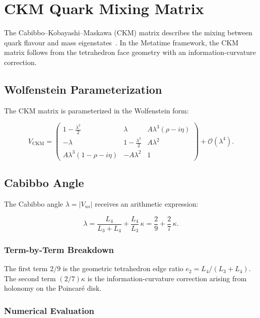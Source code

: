 \chapter{CKM Quark Mixing Matrix}
\label{ch:ckm_matrix}

The Cabibbo--Kobayashi--Maskawa (CKM) matrix describes the mixing between
quark flavour and mass eigenstates~\cite{kobayashi1973}.  In the Metatime
framework, the CKM matrix follows from the tetrahedron face geometry with
an information-curvature correction.

\section{Wolfenstein Parameterization}

The CKM matrix is parameterized in the Wolfenstein form:

\[
V_{\text{CKM}} =
\begin{pmatrix}
1 - \frac{\lambda^2}{2} & \lambda & A\lambda^3(\rho - i\eta) \\
-\lambda & 1 - \frac{\lambda^2}{2} & A\lambda^2 \\
A\lambda^3(1 - \rho - i\eta) & -A\lambda^2 & 1
\end{pmatrix}
+ \mathcal{O}(\lambda^4).
\]

\section{Cabibbo Angle}

The Cabibbo angle \(\lambda = |V_{us}|\) receives an arithmetic expression:

\begin{equation}
\lambda = \frac{L_4}{L_3 + L_4} + \frac{L_4}{L_3}\,\kappa
       = \frac{2}{9} + \frac{2}{7}\,\kappa.
\label{eq:lambda}
\end{equation}

\subsection{Term-by-Term Breakdown}

The first term \(2/9\) is the geometric tetrahedron edge ratio
\(e_2 = L_4/(L_3+L_4)\).  The second term \((2/7)\kappa\) is the
information-curvature correction arising from holonomy on the
Poincar\'{e} disk.

\subsection{Numerical Evaluation}

